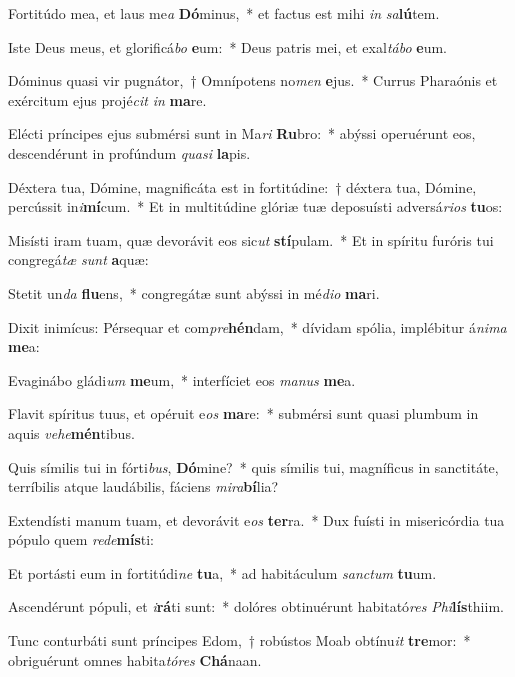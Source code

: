 \item Fortitúdo mea, et laus me\textit{a} \textbf{Dó}minus,~* et factus est mihi \textit{in} \textit{sa}\textbf{lú}tem.
\item Iste Deus meus, et glorificá\textit{bo} \textbf{e}um:~* Deus patris mei, et exal\textit{tá}\textit{bo} \textbf{e}um.
\item Dóminus quasi vir pugnátor,~† Omnípotens no\textit{men} \textbf{e}jus.~* Currus Pharaónis et exércitum ejus projé\textit{cit} \textit{in} \textbf{ma}re.
\item Elécti príncipes ejus submérsi sunt in Ma\textit{ri} \textbf{Ru}bro:~* abýssi operuérunt eos, descendérunt in profúndum \textit{qua}\textit{si} \textbf{la}pis.
\item Déxtera tua, Dómine, magnificáta est in fortitúdine:~† déxtera tua, Dómine, percússit in\textit{i}\textbf{mí}cum.~* Et in multitúdine glóriæ tuæ deposuísti adversá\textit{ri}\textit{os} \textbf{tu}os:
\item Misísti iram tuam, quæ devorávit eos sic\textit{ut} \textbf{stí}pulam.~* Et in spíritu furóris tui congregá\textit{tæ} \textit{sunt} \textbf{a}quæ:
\item Stetit un\textit{da} \textbf{flu}ens,~* congregátæ sunt abýssi in mé\textit{di}\textit{o} \textbf{ma}ri.
\item Dixit inimícus: Pérsequar et com\textit{pre}\textbf{hén}dam,~* dívidam spólia, implébitur á\textit{ni}\textit{ma} \textbf{me}a:
\item Evaginábo gládi\textit{um} \textbf{me}um,~* interfíciet eos \textit{ma}\textit{nus} \textbf{me}a.
\item Flavit spíritus tuus, et opéruit e\textit{os} \textbf{ma}re:~* submérsi sunt quasi plumbum in aquis \textit{ve}\textit{he}\textbf{mén}tibus.
\item Quis símilis tui in fórti\textit{bus}, \textbf{Dó}mine?~* quis símilis tui, magníficus in sanctitáte, terríbilis atque laudábilis, fáciens \textit{mi}\textit{ra}\textbf{bí}lia?
\item Extendísti manum tuam, et devorávit e\textit{os} \textbf{ter}ra.~* Dux fuísti in misericórdia tua pópulo quem \textit{red}\textit{e}\textbf{mís}ti:
\item Et portásti eum in fortitúdi\textit{ne} \textbf{tu}a,~* ad habitáculum \textit{sanc}\textit{tum} \textbf{tu}um.
\item Ascendérunt pópuli, et \textit{i}\textbf{rá}ti sunt:~* dolóres obtinuérunt habitató\textit{res} \textit{Phi}\textbf{lís}thiim.
\item Tunc conturbáti sunt príncipes Edom,~† robústos Moab obtínu\textit{it} \textbf{tre}mor:~* obriguérunt omnes habita\textit{tó}\textit{res} \textbf{Chá}naan.
